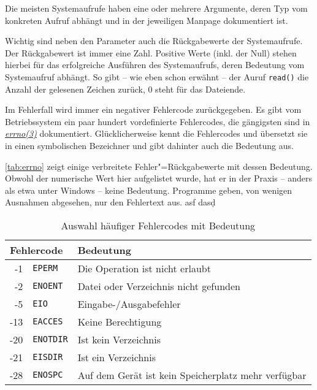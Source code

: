 
Die meisten Systemaufrufe haben eine oder mehrere Argumente, deren Typ vom konkreten Aufruf abhängt
und in der jeweiligen Manpage dokumentiert ist.

Wichtig sind neben den Parameter auch die Rückgabewerte der Systemaufrufe. Der Rückgabewert ist
immer eine Zahl. Positive Werte (inkl. der Null) stehen hierbei für das erfolgreiche Ausführen
des Systemaufrufs, deren Bedeutung vom Systemaufruf abhängt. So gibt -- wie eben schon erwähnt --
der Auruf \texttt{read()} die Anzahl der gelesenen Zeichen zurück, 0 steht für das Dateiende. 

Im Fehlerfall wird immer ein negativer Fehlercode zurückgegeben. Es gibt vom Betriebssystem ein 
paar hundert vordefinierte Fehlercodes, die gängigsten sind in
\href{http://man7.org/linux/man-pages/man3/errno.3.html}{\emph{errno(3)}} dokumentiert.
Glücklicherweise kennt \strace{} die Fehlercodes und übersetzt sie in einen symbolischen Bezeichner
und gibt dahinter auch die Bedeutung aus.

\autoref{tab:errno} zeigt einige verbreitete Fehler"=Rückgabewerte mit dessen Bedeutung. Obwohl der
numerische Wert hier aufgelistet wurde, hat er in der Praxis -- anders als etwa unter Windows --
keine Bedeutung. Programme geben, von wenigen Ausnahmen abgesehen, nur den Fehlertext aus.
asf
dasd\afs\d\af\afsd\sfd\fdsa

\begin{table}[b]
  \centering\small
  \begin{tabular}{|r@{~~}l|p{5.2cm}|}
    \hline
    \multicolumn{2}{|l|}{\textbf{Fehlercode}}        & \textbf{Bedeutung} \\
    \hline
    -1      & \texttt{EPERM}     & Die Operation ist nicht erlaubt \\
    -2      & \texttt{ENOENT}    & Datei oder Verzeichnis nicht gefunden \\
    -5      & \texttt{EIO}       & Eingabe-/Ausgabefehler \\
    -13     & \texttt{EACCES}    & Keine Berechtigung \\
    -20     & \texttt{ENOTDIR}   & Ist kein Verzeichnis \\
    -21     & \texttt{EISDIR}    & Ist ein Verzeichnis \\
    -28     & \texttt{ENOSPC}    & Auf dem Gerät ist kein Speicherplatz mehr verfügbar \\
    \hline
  \end{tabular}
  \caption{Auswahl häufiger Fehlercodes mit Bedeutung}
  \label{tab:errno}
\end{table}
